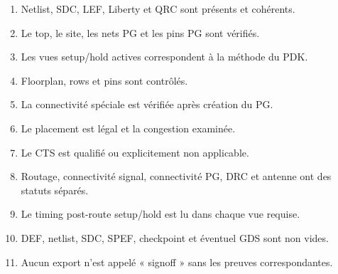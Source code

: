 \documentclass[11pt,a4paper,openany]{report}
\begin{document}
\begin{enumerate}
  \item Netlist, SDC, LEF, Liberty et QRC sont présents et cohérents.
  \item Le top, le site, les nets PG et les pins PG sont vérifiés.
  \item Les vues setup/hold actives correspondent à la méthode du PDK.
  \item Floorplan, rows et pins sont contrôlés.
  \item La connectivité spéciale est vérifiée après création du PG.
  \item Le placement est légal et la congestion examinée.
  \item Le CTS est qualifié ou explicitement non applicable.
  \item Routage, connectivité signal, connectivité PG, DRC et antenne ont des
    statuts séparés.
  \item Le timing post-route setup/hold est lu dans chaque vue requise.
  \item DEF, netlist, SDC, SPEF, checkpoint et éventuel GDS sont non vides.
  \item Aucun export n'est appelé « signoff » sans les preuves correspondantes.
\end{enumerate}
\end{document}
